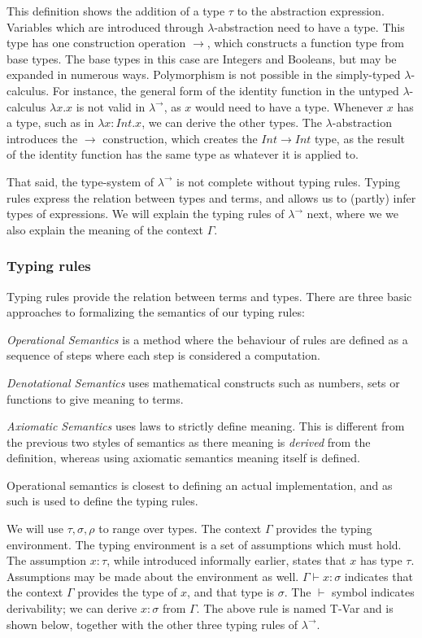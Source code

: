 This definition shows the addition of a type $\tau$ to the abstraction expression.
Variables which are introduced through $\lambda$-abstraction need to have a type.
This type has one construction operation $\rightarrow$, which constructs a function type from base types.
The base types in this case are Integers and Booleans, but may be expanded in numerous ways.
Polymorphism is not possible in the simply-typed $\lambda$-calculus.
For instance, the general form of the identity function in the untyped $\lambda$-calculus $\lambda x.x$ is not valid in $\lambda^\rightarrow$, as $x$ would need to have a type.
Whenever $x$ has a type, such as in $\lambda x:Int.x$, we can derive the other types.
The $\lambda$-abstraction introduces the $\rightarrow$ construction, which creates the $Int \rightarrow Int$ type, as the result of the identity function has the same type as whatever it is applied to.

That said, the type-system of $\lambda^\rightarrow$ is not complete without typing rules.
Typing rules express the relation between types and terms, and allows us to (partly) infer types of expressions.
We will explain the typing rules of $\lambda^\rightarrow$ next, where we we also explain the meaning of the context $\Gamma$.

\subsubsection{Typing rules}
Typing rules provide the relation between terms and types.
There are three basic approaches to formalizing the semantics of our typing rules:
\begin{itemize*}
\item \textit{Operational Semantics} is a method where the behaviour of rules are defined as a sequence of steps where each step is considered a computation.
\item \textit{Denotational Semantics} uses mathematical constructs such as numbers, sets or functions to give meaning to terms.
\item \textit{Axiomatic Semantics} uses laws to strictly define meaning. This is different from the previous two styles of semantics as there meaning is \textit{derived} from the definition, whereas using axiomatic semantics meaning itself is defined.
\end{itemize*}
Operational semantics is closest to defining an actual implementation, and as such is used to define the typing rules.

We will use $\tau, \sigma, \rho$ to range over types.
The context $\Gamma$ provides the typing environment.
The typing environment is a set of assumptions which must hold.
The assumption $x:\tau$, while introduced informally earlier, states that $x$ has type $\tau$.
Assumptions may be made about the environment as well.
$\Gamma \vdash x : \sigma$ indicates that the context $\Gamma$ provides the type of $x$, and that type is $\sigma$.
The $\vdash$ symbol indicates derivability; we can derive $x : \sigma$ from $\Gamma$.
The above rule is named T-Var and is shown below, together with the other three typing rules of $\lambda^\rightarrow$.

